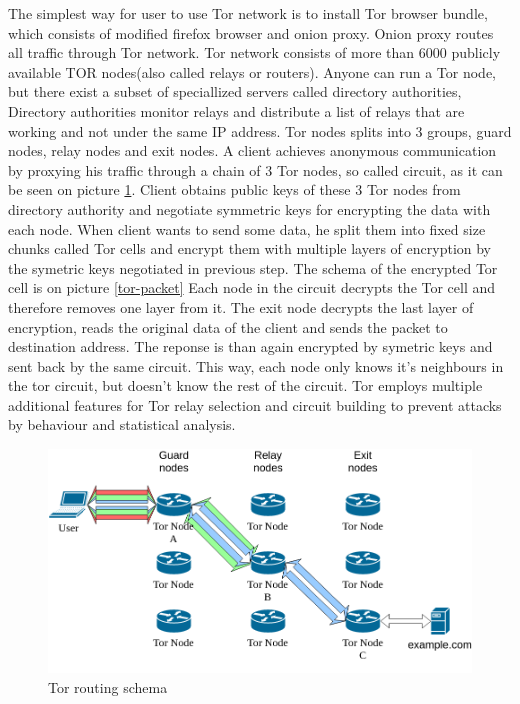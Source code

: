 \documentclass[
  digital, %
  table,   %
  lof,     %
  lot,     %
  oneside
]{fithesis3}
\begin{document}
The simplest way for user to use Tor network is to install Tor browser bundle, which consists of
modified firefox browser and onion proxy. Onion proxy routes all traffic through Tor network.
Tor network consists of more than 6000 publicly available TOR nodes(also called relays or routers).
Anyone can run a Tor node, but there exist a subset of speciallized servers called directory authorities,
Directory authorities monitor relays and distribute a list of relays that are working and 
not under the same IP address.
Tor nodes splits into 3 groups, guard nodes, relay nodes and exit nodes.
A client achieves anonymous communication by proxying his traffic through
a chain of 3 Tor nodes, so called circuit, as it can be seen on picture \ref{tor}.
Client obtains public keys of these 3 Tor nodes from directory authority and negotiate
symmetric keys for encrypting the data with each node.
When client wants to send some data, he split them into fixed size chunks
called Tor cells and encrypt them with multiple layers of encryption by the symetric keys negotiated in previous step.
The schema of the encrypted Tor cell is on picture \ref{tor-packet}
Each node in the circuit decrypts the Tor cell and therefore removes one layer from it.
The exit node decrypts the last layer of encryption, reads the original data of the client and 
sends the packet to destination address. The reponse is than again encrypted by symetric keys
and sent back by the same circuit.
This way, each node only knows it's neighbours in the tor circuit, but doesn't know the rest of the circuit.
Tor employs multiple additional features for Tor relay selection and circuit building to prevent attacks
by behaviour and statistical analysis.
 
\begin{figure}[!htb]
    \centering
    \includegraphics[width=1\textwidth]{tor}
    \caption{Tor routing schema}
    \label{tor}
\end{figure}
 
\end{document}
